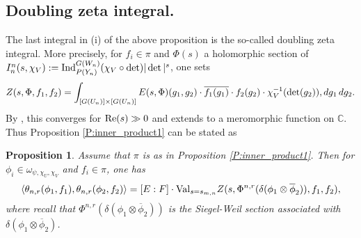 \documentclass[10pt]{amsart}
\theoremstyle{plain}
\newtheorem{Prop}[equation]{Proposition}
\numberwithin{equation}{section}
\begin{document}
\subsection{\bf  Doubling zeta integral.}
The last integral in (i) of the above proposition is the so-called doubling
zeta integral.  More precisely, for $f_i \in \pi$ and $\Phi(s)$ a
holomorphic section of  $I^n_n(s, \chi_V) := {\rm
  Ind}^{G(W_n)}_{P(Y_n)} (\chi_V \circ \det) |\det|^s$, one sets
\[  Z(s, \Phi, f_1, f_2) = 
\int_{[G(U_n)] \times [G(U_n)]} E(s,  \Phi)( g_1, g_2) \cdot \overline{f_1(g_1)} \cdot f_2(g_2) \cdot  
 \chi_V^{-1}(\det(g_2))  \\,  dg_1 \, dg_2. \]
By \cite{PS-R87}, this converges for ${\rm Re}(s) \gg 0$ and  extends to
a meromorphic function on ${\mathbb C}$. 
Thus Proposition \ref{P:inner_product1} can be stated as
 \begin{Prop}\label{P:inner_product2}
 Assume that $\pi$ is as in Proposition \ref{P:inner_product1}. Then
 for $\phi_i \in \omega_{\psi, \chi_U,\chi_V}$ and $f_i \in \pi$, one has
  \[    \langle \theta_{n,r}(\phi_1, f_1) , \theta_{n,r}(\phi_2, f_2) \rangle 
 =  [E:F] \cdot   {\rm Val}_{s= s_{m,n}} Z(s,
 \Phi^{n,r}(\delta(\phi_1\otimes \overline{\phi}_2)), f_1, f_2),\]
where recall that $\Phi^{n,r}(\delta(\phi_1\otimes
\overline{\phi}_2))$ is the Siegel-Weil section associated with
$\delta(\phi_1\otimes \overline{\phi}_2)$.
 \end{Prop}
\vskip 5pt
\end{document}
